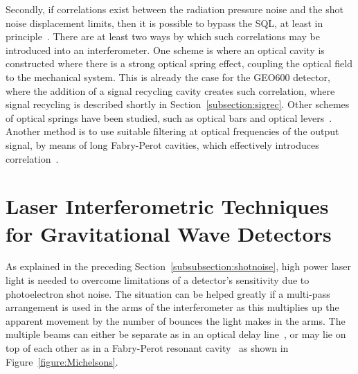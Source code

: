 \documentclass{article}
\begin{document}
Secondly, if correlations exist between the radiation pressure noise and the
shot noise displacement limits, then it is possible to bypass the SQL, at least
in principle~\cite{Loudon:1981}.  There are at least two ways by which such
correlations may be introduced into an interferometer.  One scheme is where an
optical cavity is constructed where there is a strong optical spring effect,
coupling the optical field to the mechanical system.  This is already the case
for the GEO600 detector, where the addition of a signal recycling cavity creates
such correlation, where signal recycling is described shortly in
Section~\ref{subsection:sigrec}. Other schemes of optical springs have been studied,
such as optical bars and optical levers~\cite{Braginsky:1996, Braginsky:1997}.
Another method is to use suitable filtering at optical frequencies of the
output signal, by means of long Fabry-Perot cavities, which effectively
introduces correlation~\cite{Kimble:2001, Corbitt:2004}.


\newpage

\section{Laser Interferometric Techniques for Gravitational Wave Detectors}
\label{section:interferometry}

As explained in the preceding Section~\ref{subsubsection:shotnoise}, high power laser
light is needed to overcome limitations of a detector's sensitivity due to
photoelectron shot noise. The situation can be helped greatly if a multi-pass
arrangement is used in the arms of the interferometer as this multiplies up the
apparent movement by the number of bounces the light makes in the arms. The
multiple beams can either be separate as in an optical delay line~\cite{Weiss,
Billing}, or may lie on top of each other as in a Fabry-Perot resonant
cavity~\cite{Drever2} as shown in Figure~\ref{figure:Michelsons}.

\end{document}
